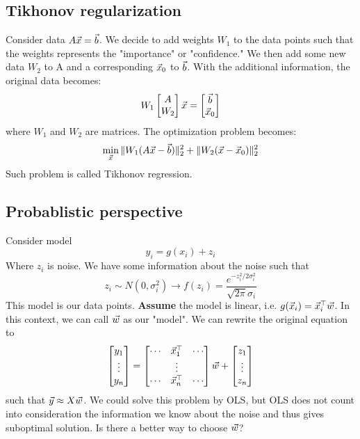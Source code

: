 
\subsection{Tikhonov regularization} %
\label{sub:tikhonov_regularization}

\begin{definition}
	Consider data $A\vec{x} = \vec{b}$. We decide to add weights $W_1$ to the data points such that the weights represents the "importance" or "confidence." We then add some new data $W_2$ to A and a corresponding $\vec{x}_0$ to $\vec{b}$. With the additional information, the original data becomes:
	\[
W_1\begin{bmatrix}
	A \\ W_2
\end{bmatrix}\vec{x} = \begin{bmatrix}
	\vec{b} \\ \vec{x}_0
\end{bmatrix}
	\]
	where $W_1$ and $W_2$ are matrices. The optimization problem becomes:
	\[
\min_{\vec{x}}\|W_1(A\vec{x}-\vec{b})\|_2^2+\|W_2(\vec{x}-\vec{x}_0)\|_2^2
	\]
	Such problem is called Tikhonov regression.
\end{definition}


\subsection{Probablistic perspective} %
\label{sub:probablistic_perspective}

\begin{definition}
	Consider model
	\[
y_i = g(x_i)+z_i
	\]
	Where $z_i$ is noise. We have some information about the noise such that 
	\[
z_i \sim N(0,\sigma_i^2) \rightarrow f(z_i) = \frac{e^{-z_i^2/2\sigma_i^2}}{\sqrt{2\pi}\sigma_i}
	\]
	This model is our data points. \textbf{Assume} the model is linear, i.e. $g(\vec{x}_i) = \vec{x}_i^\top\vec{w}$. In this context, we can call $\vec{w}$ as our "model". We can rewrite the original equation to
	\[
\begin{bmatrix}
	y_1\\\vdots\\y_n
\end{bmatrix} = \begin{bmatrix}
	\cdots&\vec{x}_1^\top&\cdots\\
	&\vdots&\\
	\cdots&\vec{x}_n^\top&\cdots
\end{bmatrix}\vec{w}+\begin{bmatrix}
	z_1\\\vdots\\z_n
\end{bmatrix}
	\]
	such that $\vec{y}\approx X\vec{w}$. We could solve this problem by OLS, but OLS does not count into consideration the information we know about the noise and thus gives suboptimal solution. Is there a better way to choose $\vec{w}$?
\end{definition}

